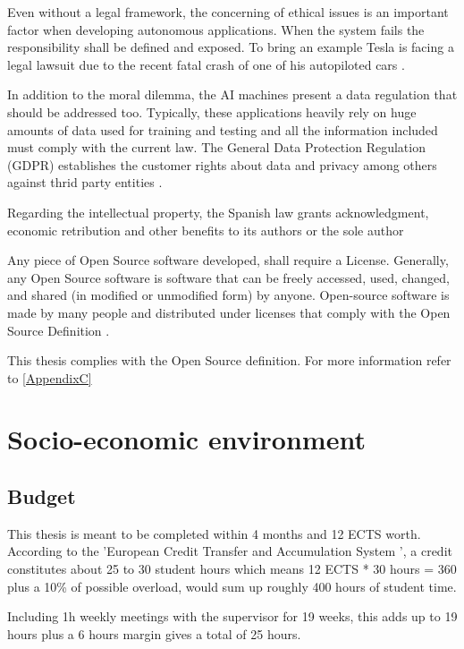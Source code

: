 Even without a legal framework, the concerning of ethical issues is an important factor when developing autonomous applications.
When the system fails the responsibility shall be defined and exposed. 
To bring an example Tesla is facing a legal lawsuit due to the recent fatal crash of one of his autopiloted cars \cite{tesla}.


In addition to the moral dilemma, the AI machines present a data regulation that should be addressed too.
Typically, these applications heavily rely on huge amounts of data used for training and testing and all the information included must comply with the current law.
The General Data Protection Regulation (GDPR) establishes the customer rights about data and privacy among others against thrid party entities \cite{InformationCommissionersOffice2018}.


Regarding the intellectual property, the Spanish law grants acknowledgment, economic retribution and other benefits to its authors or the sole author \cite{OrganizacionMundialdelaPropiedadIntelectual-OMPI-2016}


Any piece of Open Source software developed, shall require a License.
Generally, any Open Source software is software that can be freely accessed, used, changed, and shared (in modified or unmodified form) by anyone. 
Open-source software is made by many people and distributed under licenses that comply with the Open Source Definition \cite{opensource} \cite{opensourcedef}.

This thesis complies with the Open Source definition. For more information refer to \ref{AppendixC}


\newpage

\section{Socio-economic environment}
\subsection{Budget}

This thesis is meant to be completed within 4 months and 12 ECTS worth. 
According to the 'European Credit Transfer and Accumulation System \cite{EuropeanCommission2009}', 
a credit constitutes about 25 to 30 student hours which means 12 ECTS * 30 hours = 360 plus a 10\% of possible overload, would sum up roughly 400 hours of student time.

Including 1h weekly meetings with the supervisor for 19 weeks, this adds up to 19 hours plus a 6 hours margin gives a total of 25 hours.

